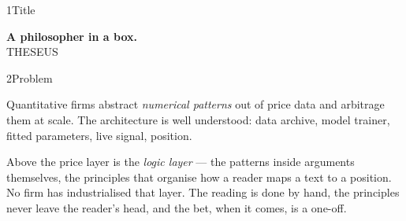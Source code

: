\documentclass[10pt]{article}
\begin{document}
\begin{slide}{1}{Title}
  \vspace*{1.6in}
  \begin{center}
    {\rmfamily\bfseries\fontsize{56pt}{60pt}\selectfont\color{ink}
      A philosopher in a box.}\\[0.5in]
    {\sffamily\fontsize{14pt}{18pt}\selectfont\color{amber}
      THESEUS\quad\textbullet{}}
  \end{center}
\end{slide}

\begin{slide}{2}{Problem}
  \sliderule

  Quantitative firms abstract \emph{numerical patterns} out of price
  data and arbitrage them at scale. The architecture is well
  understood: data archive, model trainer, fitted parameters, live
  signal, position.

  \vspace{0.2in}

  Above the price layer is the \emph{logic layer} --- the patterns
  inside arguments themselves, the principles that organise how a
  reader maps a text to a position. No firm has industrialised that
  layer. The reading is done by hand, the principles never leave the
  reader's head, and the bet, when it comes, is a one-off.

  \vspace{0.25in}

\end{slide}
\end{document}

